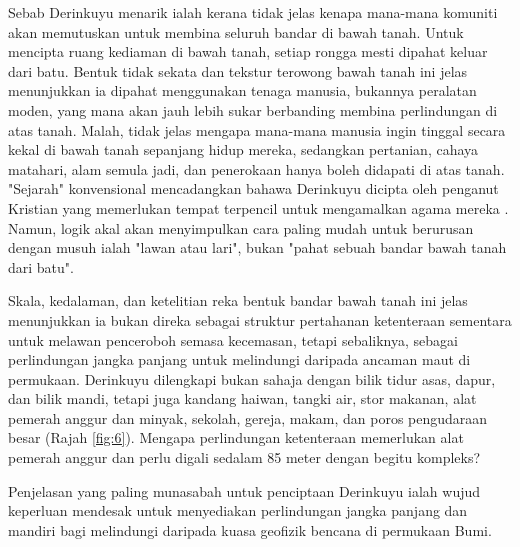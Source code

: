 \documentclass[10pt,twocolumn,letterpaper]{article}
\begin{document}
Sebab Derinkuyu menarik ialah kerana tidak jelas kenapa mana-mana komuniti akan memutuskan untuk membina seluruh bandar di bawah tanah. Untuk mencipta ruang kediaman di bawah tanah, setiap rongga mesti dipahat keluar dari batu. Bentuk tidak sekata dan tekstur terowong bawah tanah ini jelas menunjukkan ia dipahat menggunakan tenaga manusia, bukannya peralatan moden, yang mana akan jauh lebih sukar berbanding membina perlindungan di atas tanah. Malah, tidak jelas mengapa mana-mana manusia ingin tinggal secara kekal di bawah tanah sepanjang hidup mereka, sedangkan pertanian, cahaya matahari, alam semula jadi, dan penerokaan hanya boleh didapati di atas tanah. "Sejarah" konvensional mencadangkan bahawa Derinkuyu dicipta oleh penganut Kristian yang memerlukan tempat terpencil untuk mengamalkan agama mereka \cite{53}. Namun, logik akal akan menyimpulkan cara paling mudah untuk berurusan dengan musuh ialah "lawan atau lari", bukan "pahat sebuah bandar bawah tanah dari batu".

Skala, kedalaman, dan ketelitian reka bentuk bandar bawah tanah ini jelas menunjukkan ia bukan direka sebagai struktur pertahanan ketenteraan sementara untuk melawan penceroboh semasa kecemasan, tetapi sebaliknya, sebagai perlindungan jangka panjang untuk melindungi daripada ancaman maut di permukaan. Derinkuyu dilengkapi bukan sahaja dengan bilik tidur asas, dapur, dan bilik mandi, tetapi juga kandang haiwan, tangki air, stor makanan, alat pemerah anggur dan minyak, sekolah, gereja, makam, dan poros pengudaraan besar (Rajah \ref{fig:6}). Mengapa perlindungan ketenteraan memerlukan alat pemerah anggur dan perlu digali sedalam 85 meter dengan begitu kompleks?

Penjelasan yang paling munasabah untuk penciptaan Derinkuyu ialah wujud keperluan mendesak untuk menyediakan perlindungan jangka panjang dan mandiri bagi melindungi daripada kuasa geofizik bencana di permukaan Bumi.
\end{document}
